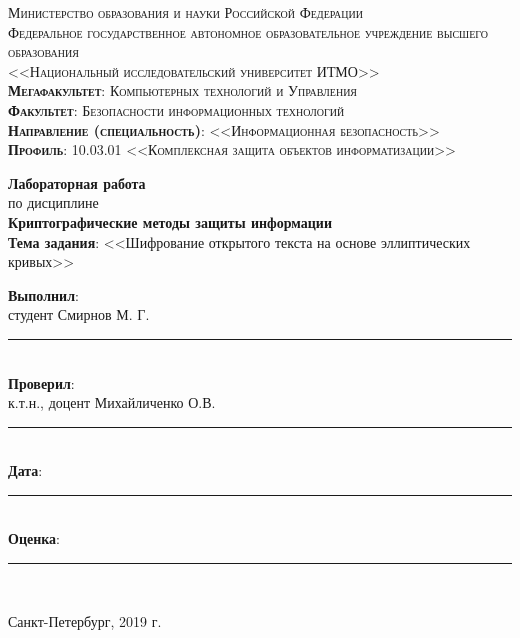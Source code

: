 \begin{titlepage}
	\begin{center}
		\textsc{
			\fontsize{12pt}{14pt}\selectfont
			Министерство образования и науки Российской Федерации\\
Федеральное государственное автономное образовательное учреждение высшего образования\\
<<Национальный исследовательский университет ИТМО>>\\
	\textbf{Мегафакультет}:  Компьютерных технологий и Управления\\
			\textbf{Факультет}: Безопасности информационных технологий\\
			\textbf{Направление (специальность)}: <<Информационная безопасность>>\\
			\textbf{Профиль}: 10.03.01 <<Комплексная защита объектов информатизации>>}
		
		\vfill
		
		\textbf{Лабораторная работа}\\
		по дисциплине\\
		\textbf{Криптографические методы защиты информации}\\
	\vfill
	\textbf{Тема задания}: <<Шифрование открытого текста на основе эллиптических кривых>>\\
	\end{center}

	\vfill
	
	\begin{flushright}
	\textbf{Выполнил}:\\ студент Смирнов М. Г. \rule{5em}{.1pt}\\
	\textbf{Проверил}:\\ к.т.н., доцент Михайличенко О.В.\rule{5em}{.1pt}\\
		\vfill
	\textbf{Дата}: \rule{10em}{.1pt}\\
	\textbf{Оценка}: \rule{10em}{.1pt}\\

	\vfill
	


	\end{flushright}
	\vfill
	\begin{center}
		Санкт-Петербург, 2019 г.
	\end{center}
\end{titlepage}